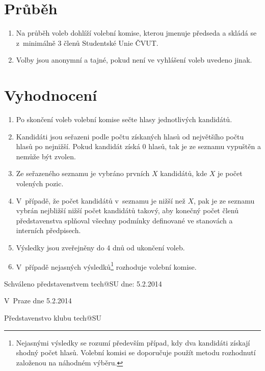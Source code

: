 \documentclass[10pt]{article}
\def \Datum {5.2.2014} %
\begin{document}
\section{Průběh}
	\begin{enumerate}
		\item Na průběh voleb dohlíží volební komise, kterou jmenuje předseda a skládá se z~minimálně 3 členů Studentské Unie ČVUT.
		\item Volby jsou anonymní a tajné, pokud není ve vyhlášení voleb uvedeno jinak.
	\end{enumerate}

\section{Vyhodnocení}
	\begin{enumerate}
		\item Po skončení voleb volební komise sečte hlasy jednotlivých kandidátů.
		\item Kandidáti jsou seřazeni podle počtu získaných hlasů od největšího počtu hlasů po nejnižší. Pokud kandidát získá 0 hlasů, tak je ze seznamu vypuštěn a nemůže být zvolen.
		\item Ze seřazeného seznamu je vybráno prvních $X$ kandidátů, kde $X$ je počet volených pozic.
		\item V~případě, že počet kandidátů v~seznamu je nižší než $X$, pak je ze seznamu vybrán nejbližší nižší počet kandidátů takový, aby konečný počet členů představenstva splňoval všechny podmínky definované ve stanovách a interních předpisech.
		\item Výsledky jsou zveřejněny do 4 dnů od ukončení voleb.
		\item V~případě nejasných výsledků\footnote{Nejasnými výsledky se rozumí především případ, kdy dva kandidáti získají shodný počet hlasů. Volební komisi se doporučuje použít metodu rozhodnutí založenou na náhodném výběru.} rozhoduje volební komise.
	\end{enumerate}

\vspace{10mm}

Schváleno představenstvem tech@SU dne: \Datum

\vspace{30mm}

\hfill V~Praze dne \Datum

\hfill Představenstvo klubu tech@SU
\end{document}

